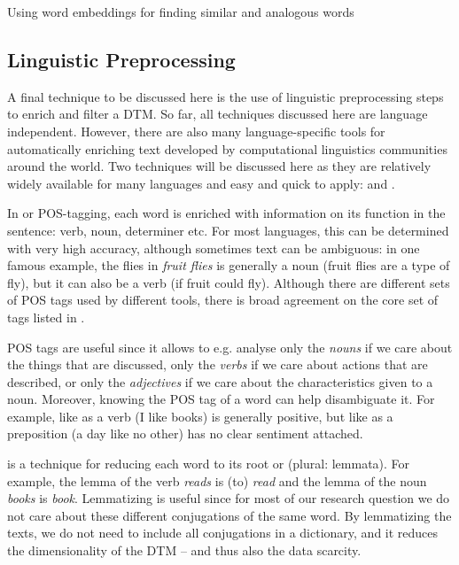 \begin{ccsexample}
\caption{Using word embeddings for finding similar and analogous words}
\end{ccsexample}





\subsection{Linguistic Preprocessing}
\label{sec:nlp}

A final technique to be discussed here is the use of linguistic preprocessing steps to enrich and filter a DTM.
So far, all techniques discussed here are language independent.
However, there are also many language-specific tools for automatically enriching text developed by computational linguistics communities around the world.
Two techniques will be discussed here as they are relatively widely available for many languages and easy and quick to apply:  and .

In  or POS-tagging, each word is enriched with information on its function in the sentence: verb, noun, determiner etc.
For most languages, this can be determined with very high accuracy, although sometimes text can be ambiguous:
in one famous example, the flies in \emph{fruit flies} is generally a noun (fruit flies are a type of fly), but it can also be a verb (if fruit could fly). 
Although there are different sets of POS tags used by different tools, there is broad agreement on the core set of tags listed in .

POS tags are useful since it allows to e.g. analyse only the \textit{nouns} if we care about the things that are discussed, only the \textit{verbs} if we care about actions that are described, or only the \textit{adjectives} if we care about the characteristics given to a noun.
Moreover, knowing the POS tag of a word can help disambiguate it.
For example, like as a verb (I like books) is generally positive, but like as a preposition (a day like no other) has no clear sentiment attached.

 is a technique for reducing each word to its root or  (plural: lemmata).
For example, the lemma of the verb \emph{reads} is (to) \emph{read} and the lemma of the noun \emph{books} is \emph{book}.
Lemmatizing is useful since for most of our research question we do not care about these different conjugations of the same word.
By lemmatizing the texts, we do not need to include all conjugations in a dictionary,
and it reduces the dimensionality of the DTM -- and thus also the data scarcity.

